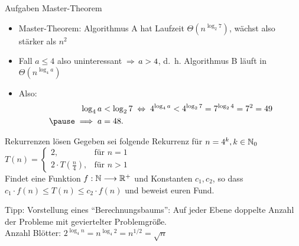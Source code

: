 \begin{frame}{Aufgaben Master-Theorem}
	\solutionheading 
	\begin{itemize}
		\item Master-Theorem: Algorithmus A hat Laufzeit $\Theta(n^{\log _{2}7})$, wächst also stärker als $n^2$
		\pause
		\item Fall $a \leq 4$ also uninteressant $\impl a > 4$, d.~h. Algorithmus B läuft in $\Theta(n^{\log _{4}a})$ \\
		\pause 
		\item Also: 
		\begin{align*}
			\log_{4}a &< \log_{2}7 \gdw 4^{\log_{4}a} < 4^{\log_{2}7} = 7^{\log_{2} 4} = 7^2 = 49 \\ \pause  %
			\Impl a &= 48.
		\end{align*}
	\end{itemize}
\end{frame}


\begin{frame}{Rekurrenzen lösen}
	\pause
	Gegeben sei folgende Rekurrenz für $n = 4^k, k \in \mathbb{N}_0$ \\[0,5cm]
	\begin{math}
	T(n) = 
	\begin{cases}
	2,                       & \text{für } n = 1 \\
	2 \cdot T(\frac{n}{4}),  & \text{für } n > 1
	\end{cases}
	\end{math} \\[0,5cm]
	Findet eine Funktion $f : \mathbb{N} \longrightarrow \mathbb{R}^+$ und Konstanten $c_1, c_2$, so dass $c_1 \cdot f(n) \leq T(n) \leq c_2 \cdot f(n)$ und beweist euren Fund.
	
	\pause
	\bigskip
	Tipp: Vorstellung eines \enquote{Berechnungsbaums}: Auf jeder Ebene doppelte Anzahl der Probleme mit geviertelter Problemgröße.\\ \pause
	Anzahl Blötter: \quad $2^{\log_{4}n} = n^{\log_{4}2} = n^{1/2} = \sqrt{n}$
\end{frame}

